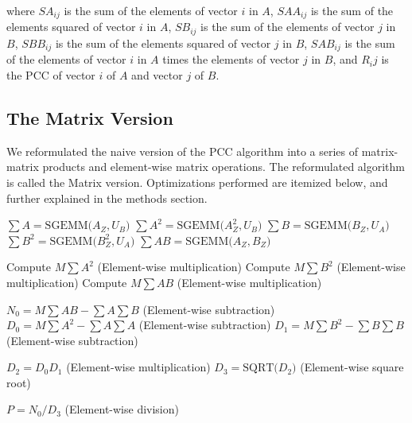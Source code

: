 \documentclass{bioinfo}
\begin{document}
\vspace{2mm}

\noindent where $SA_{ij}$ is the sum of the elements of vector $i$ in $A$, 
$SAA_{ij}$ is the sum of the elements squared of vector $i$ in $A$, 
$SB_{ij}$ is the sum of the elements of vector $j$ in $B$, 
$SBB_{ij}$ is the sum of the elements squared of vector $j$ in $B$, 
$SAB_{ij}$ is the sum of the elements of vector $i$ in $A$ times the  elements of vector $j$ in $B$, 
and $R_ij$ is the PCC of vector $i$ of $A$ and vector $j$ of $B$.

\subsection{The Matrix Version}
We reformulated the naive version of the PCC algorithm into a series of 
matrix-matrix products and element-wise matrix operations. The 
reformulated algorithm is called the Matrix version. Optimizations 
performed are itemized below, and further explained in the methods section.
\vspace{2mm}

\begin{algorithmic}[1]

  \STATE $\sum A=\text{SGEMM(}A_Z,U_B\text{)}$
  \STATE $\sum A^2=\text{SGEMM(}A_Z^2,U_B\text{)}$
  \STATE $\sum B=\text{SGEMM(}B_Z,U_A\text{)}$
  \STATE $\sum B^2=\text{SGEMM(}B_Z^2,U_A\text{)}$
  \STATE $\sum AB=\text{SGEMM(}A_Z,B_Z\text{)}$
  
  \vspace{2mm}

  \STATE Compute $M\sum A^2$   (Element-wise multiplication)
  \STATE Compute $M\sum B^2$   (Element-wise multiplication)
  \STATE Compute $M\sum AB$   (Element-wise multiplication)
  
  \vspace{2mm}

  \STATE $N_0=M\sum AB - \sum A\sum B$   (Element-wise subtraction)
  \STATE $D_0=M\sum A^2 - \sum A\sum A$   (Element-wise subtraction)
  \STATE $D_1=M\sum B^2 - \sum B\sum B$   (Element-wise subtraction)

  \vspace{2mm}

  \STATE $D_2=D_0 D_1 $   (Element-wise multiplication)
  \STATE $D_3=\text{SQRT(}D_2\text{)}$   (Element-wise square root)

  \vspace{2mm}

  \STATE $P=N_0 / D_3$   (Element-wise division)
  
\end{algorithmic}
\end{document}
